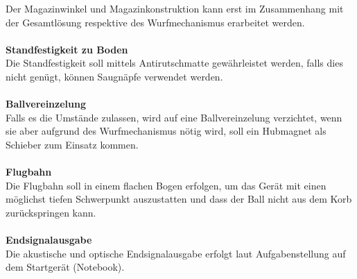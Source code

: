 	Der Magazinwinkel und Magazinkonstruktion kann erst im Zusammenhang mit der Gesamtlösung respektive des Wurfmechanismus erarbeitet werden.\\
	\\
	\textbf{Standfestigkeit zu Boden}\\
	Die Standfestigkeit soll mittels Antirutschmatte gewährleistet werden, falls dies nicht genügt, können Saugnäpfe verwendet werden.\\
	\\
	\textbf{Ballvereinzelung}\\
	Falls es die Umstände zulassen, wird auf eine Ballvereinzelung verzichtet, wenn sie aber aufgrund des Wurfmechanismus nötig wird, soll ein Hubmagnet als Schieber zum Einsatz kommen.\\
	\\
	\textbf{Flugbahn}\\
	Die Flugbahn soll in einem flachen Bogen erfolgen, um das Gerät mit einen möglichst tiefen Schwerpunkt auszustatten und dass der Ball nicht aus dem Korb zurückspringen kann.\\
	\\
	\textbf{Endsignalausgabe}\\
	Die akustische und optische Endsignalausgabe erfolgt laut Aufgabenstellung auf dem Startgerät (Notebook).\\
